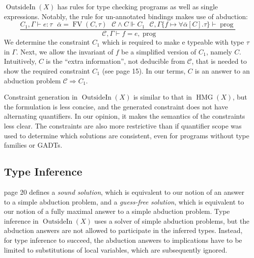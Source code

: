 \documentclass{article}
\newcommand{\tmem}[1]{{\em #1\/}}
\newcommand{\tmop}[1]{\ensuremath{\operatorname{#1}}}
\begin{document}
$\tmop{OutsideIn} (X)$ has rules for type checking programs as well as single
expressions. Notably, the rule for un-annotated bindings makes use of
abduction:
\[ \frac{C_1, \Gamma \vdash e : \tau \text{ \ \ \ } \bar{\alpha} = \tmop{FV}
   (C, \tau) \text{ \ \ \ } \mathcal{C} \wedge C \Vdash C_1 \text{ \ \ \ }
   \mathcal{C}, \Gamma \{ f \mapsto \forall \bar{\alpha} [C] . \tau \} \vdash
   \tmop{prog}}{\text{ \ \ \ } \mathcal{C}, \Gamma \vdash f = e, \tmop{prog}}
\]
We determine the constraint $C_1$ which is required to make e typeable with
type $\tau$ in $\Gamma$. Next, we allow the invariant of $f$ be a simplified
version of $C_1$, namely $C$. Intuitively, $C$ is the ``extra information'',
not deducible from $\mathcal{C}$, that is needed to show the required
constraint $C_1$ (see {\cite{OutsideIn}} page 15). In our terms, $C$ is an
answer to an abduction problem $\mathcal{C} \Rightarrow C_1$.

Constraint generation in $\tmop{OutsideIn} (X)$ is similar to that in
$\tmop{HMG} (X)$, but the formulation is less concise, and the generated
constraint does not have alternating quantifiers. In our opinion, it makes the
semantics of the constraints less clear. The constraints are also more
restrictive than if quantifier scope was used to determine which solutions are
consistent, even for programs without type families or GADTs.

\subsection{Type Inference}

{\cite{OutsideIn}} page 20 defines a {\tmem{sound solution}}, which is
equivalent to our notion of an answer to a simple abduction problem, and a
{\tmem{guess-free solution}}, which is equivalent to our notion of a fully
maximal answer to a simple abduction problem. Type inference in
$\tmop{OutsideIn} (X)$ uses a solver of simple abduction problems, but the
abduction answers are not allowed to participate in the inferred types.
Instead, for type inference to succeed, the abduction answers to implications
have to be limited to substitutions of local variables, which are subsequently
ignored.
\end{document}
